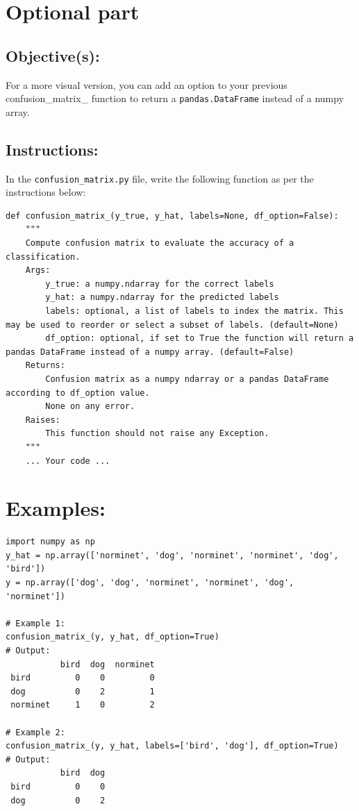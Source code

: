 \documentclass{42-en}
\begin{document}
\section{Optional part}

\subsection{Objective(s):}

For a more visual version, you can add an option to your previous confusion\_matrix\_ function to return a \texttt{pandas.DataFrame} instead of a numpy array.

\subsection{Instructions:}

In the \texttt{confusion\_matrix.py} file, write the following function as per the instructions below:

\begin{verbatim}
def confusion_matrix_(y_true, y_hat, labels=None, df_option=False):
    """
    Compute confusion matrix to evaluate the accuracy of a classification.
    Args:
        y_true: a numpy.ndarray for the correct labels
        y_hat: a numpy.ndarray for the predicted labels
        labels: optional, a list of labels to index the matrix. This may be used to reorder or select a subset of labels. (default=None)
        df_option: optional, if set to True the function will return a pandas DataFrame instead of a numpy array. (default=False)
    Returns: 
        Confusion matrix as a numpy ndarray or a pandas DataFrame according to df_option value.
        None on any error.
    Raises:
        This function should not raise any Exception.
    """
    ... Your code ...
\end{verbatim}

\section{Examples:}

\begin{verbatim}
import numpy as np
y_hat = np.array(['norminet', 'dog', 'norminet', 'norminet', 'dog', 'bird'])
y = np.array(['dog', 'dog', 'norminet', 'norminet', 'dog', 'norminet'])

# Example 1: 
confusion_matrix_(y, y_hat, df_option=True)
# Output:
           bird  dog  norminet
 bird         0    0         0
 dog          0    2         1
 norminet     1    0         2

# Example 2:
confusion_matrix_(y, y_hat, labels=['bird', 'dog'], df_option=True)
# Output:
           bird  dog
 bird         0    0
 dog          0    2
\end{verbatim}
\end{document}
